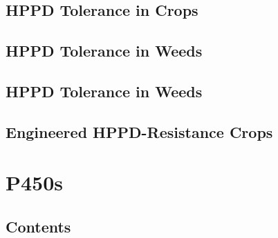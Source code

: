 \hypertarget{hppd-tolerance-in-crops}{%
\subsection{HPPD Tolerance in Crops}\label{hppd-tolerance-in-crops}}

\hypertarget{hppd-tolerance-in-weeds}{%
\subsection{HPPD Tolerance in Weeds}\label{hppd-tolerance-in-weeds}}

\hypertarget{hppd-tolerance-in-weeds-1}{%
\subsection{HPPD Tolerance in Weeds}\label{hppd-tolerance-in-weeds-1}}

\hypertarget{engineered-hppd-resistance-crops-1}{%
\subsection{Engineered HPPD-Resistance
Crops}\label{engineered-hppd-resistance-crops-1}}

\hypertarget{p450s}{%
\section{P450s}\label{p450s}}

\hypertarget{contents-4}{%
\subsection{Contents}\label{contents-4}}

